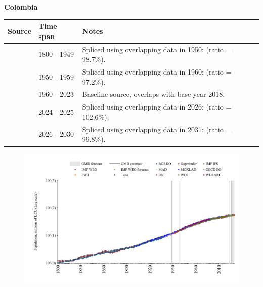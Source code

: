 \documentclass[12pt,a4paper,landscape]{article}
\begin{document}
\begin{adjustbox}{max totalsize={\paperwidth}{\paperheight},center}
\begin{minipage}[t][\textheight][t]{\textwidth}
\vspace*{0.5cm}
{}
\begin{center}
{\Large\bfseries Colombia}
\end{center}
\vspace{0.5cm}
\begin{table}[H]
\centering
\small
\begin{tabular}{|l|l|l|}
\hline
\textbf{Source} & \textbf{Time span} & \textbf{Notes} \\
\hline
\rowcolor{white}\cite{Gapminder}& 1800 - 1949 &Spliced using overlapping data in 1950: (ratio = 98.7\%).\\
\rowcolor{lightgray}\cite{IMF_IFS}& 1950 - 1959 &Spliced using overlapping data in 1960: (ratio = 97.2\%).\\
\rowcolor{white}\cite{WDI}& 1960 - 2023 &Baseline source, overlaps with base year 2018.\\
\rowcolor{lightgray}\cite{OECD_EO}& 2024 - 2025 &Spliced using overlapping data in 2026: (ratio = 102.6\%).\\
\rowcolor{white}\cite{Gapminder}& 2026 - 2030 &Spliced using overlapping data in 2031: (ratio = 99.8\%).\\
\hline
\end{tabular}
\end{table}
\begin{figure}[H]
\centering
\includegraphics[width=\textwidth,height=0.6\textheight,keepaspectratio]{graphs/COL_pop.pdf}
\end{figure}
\end{minipage}
\end{adjustbox}
\end{document}
